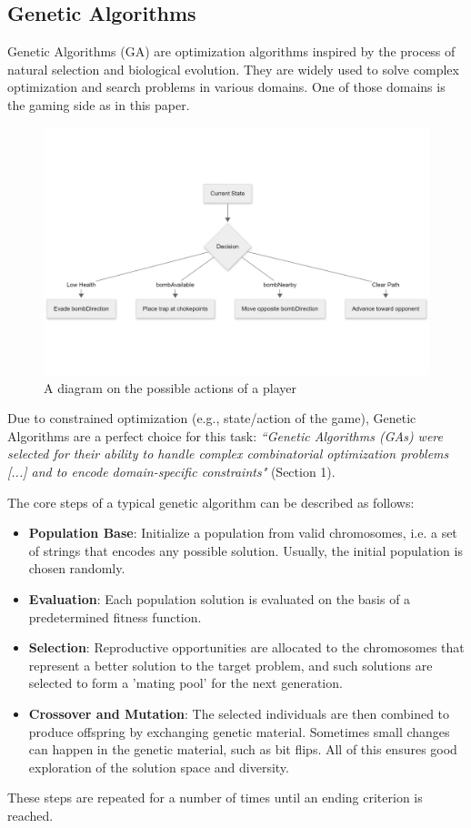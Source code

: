 \documentclass[sigconf]{acmart} %
\begin{document}
\subsection{Genetic Algorithms}
Genetic Algorithms (GA) are optimization algorithms inspired by the process of natural selection and biological evolution. They are widely used to solve complex optimization and search problems in various domains. 
One of those domains is the gaming side as in this paper. 
\begin{figure}
      \centering
      \includegraphics[width = 1\linewidth]{pictures/possibleActionsPlayer.png}
      \caption{\label{fig:possibleActionsPlayer}A diagram on the possible actions of a player}
      \end{figure}
Due to constrained optimization (e.g., state/action of the game), Genetic Algorithms are a perfect choice for this task: 
\textit{``Genetic Algorithms (GAs) were selected for their ability to handle complex combinatorial optimization problems [...] and to encode domain-specific constraints"} (Section 1).

The core steps of a typical genetic algorithm can be described as follows:
\begin{itemize}
    \item \textbf{Population Base}: Initialize a population from valid chromosomes, i.e. a set of strings that encodes any possible solution. Usually, the initial population is chosen randomly.
    \item \textbf{Evaluation}: Each population solution is evaluated on the basis of a predetermined fitness function.
    \item \textbf{Selection}: Reproductive opportunities are allocated to the chromosomes that represent a better solution to the target problem, and such solutions are selected to form a 'mating pool' for the next generation.
    \item \textbf{Crossover and Mutation}: The selected individuals are then combined to produce offspring by exchanging genetic material. Sometimes small changes can happen in the genetic material, such as bit flips. All of this ensures good exploration of the solution space and diversity.
    
\end{itemize}
These steps are repeated for a number of times until an ending criterion is reached.
\end{document}
